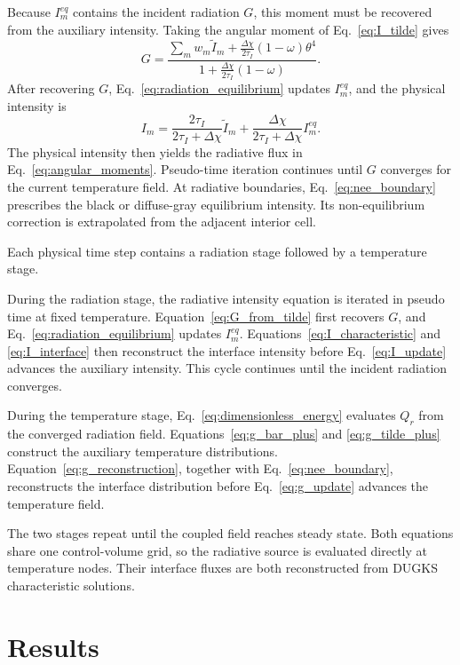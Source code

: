 \documentclass[a4paper,12pt]{ctexart}
\numberwithin{equation}{section}
\begin{document}
Because $I_m^{eq}$ contains the incident radiation $G$, this moment must be recovered from the auxiliary intensity. Taking the angular moment of Eq.~\eqref{eq:I_tilde} gives
\begin{equation}
G=\frac{\sum_m w_m\tilde I_m+\frac{\Delta\chi}{2\tau_I}(1-\omega)\theta^4}
{1+\frac{\Delta\chi}{2\tau_I}(1-\omega)}.
\label{eq:G_from_tilde}
\end{equation}
After recovering $G$, Eq.~\eqref{eq:radiation_equilibrium} updates $I_m^{eq}$, and the physical intensity is
\begin{equation*}
I_m=\frac{2\tau_I}{2\tau_I+\Delta\chi}\tilde I_m+\frac{\Delta\chi}{2\tau_I+\Delta\chi}I_m^{eq}.
\end{equation*}
The physical intensity then yields the radiative flux in Eq.~\eqref{eq:angular_moments}. Pseudo-time iteration continues until $G$ converges for the current temperature field. At radiative boundaries, Eq.~\eqref{eq:nee_boundary} prescribes the black or diffuse-gray equilibrium intensity. Its non-equilibrium correction is extrapolated from the adjacent interior cell.

Each physical time step contains a radiation stage followed by a temperature stage.

During the radiation stage, the radiative intensity equation is iterated in pseudo time at fixed temperature. Equation~\eqref{eq:G_from_tilde} first recovers $G$, and Eq.~\eqref{eq:radiation_equilibrium} updates $I_m^{eq}$. Equations~\eqref{eq:I_characteristic} and \eqref{eq:I_interface} then reconstruct the interface intensity before Eq.~\eqref{eq:I_update} advances the auxiliary intensity. This cycle continues until the incident radiation converges.

During the temperature stage, Eq.~\eqref{eq:dimensionless_energy} evaluates $Q_r$ from the converged radiation field. Equations~\eqref{eq:g_bar_plus} and \eqref{eq:g_tilde_plus} construct the auxiliary temperature distributions. Equation~\eqref{eq:g_reconstruction}, together with Eq.~\eqref{eq:nee_boundary}, reconstructs the interface distribution before Eq.~\eqref{eq:g_update} advances the temperature field.

The two stages repeat until the coupled field reaches steady state. Both equations share one control-volume grid, so the radiative source is evaluated directly at temperature nodes. Their interface fluxes are both reconstructed from DUGKS characteristic solutions.

\section{Results}
\label{sec:results}
\end{document}
